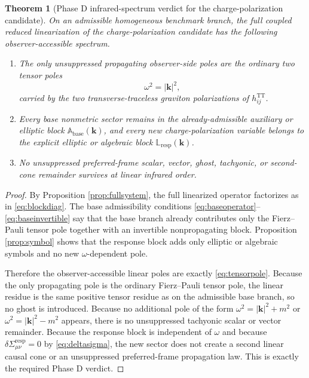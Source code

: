 \documentclass[11pt]{article}
\newcommand{\ResponseShift}{\Sigma^{\mathrm{resp}}}
\newcommand{\BaseEll}{\mathbb A_{\mathrm{base}}}
\newcommand{\RespLin}{\mathbb L_{\mathrm{resp}}}
\newcommand{\TT}{\mathrm{TT}}
\newtheorem{theorem}{Theorem}
\begin{document}
\begin{theorem}[Phase D infrared-spectrum verdict for the charge-polarization candidate]
\label{thm:phaseD}
On an admissible homogeneous benchmark branch, the full coupled reduced linearization of the charge-polarization candidate has the following observer-accessible spectrum.
\begin{enumerate}
    \item The only unsuppressed propagating observer-side poles are the ordinary two tensor poles
    \begin{equation}
    \omega^2=|\mathbf{k}|^2,
    \label{eq:tensorpole}
    \end{equation}
    carried by the two transverse-traceless graviton polarizations of \(h^{\TT}_{ij}\).
    \item Every base nonmetric sector remains in the already-admissible auxiliary or elliptic block \(\BaseEll(\mathbf{k})\), and every new charge-polarization variable belongs to the explicit elliptic or algebraic block \(\RespLin(\mathbf{k})\).
    \item No unsuppressed preferred-frame scalar, vector, ghost, tachyonic, or second-cone remainder survives at linear infrared order.
\end{enumerate}
\end{theorem}

\begin{proof}
By Proposition \ref{prop:fullsystem}, the full linearized operator factorizes as in \eqref{eq:blockdiag}. The base admissibility conditions \eqref{eq:baseoperator}--\eqref{eq:baseinvertible} say that the base branch already contributes only the Fierz--Pauli tensor pole together with an invertible nonpropagating block. Proposition \ref{prop:symbol} shows that the response block adds only elliptic or algebraic symbols and no new \(\omega\)-dependent pole.

Therefore the observer-accessible linear poles are exactly \eqref{eq:tensorpole}. Because the only propagating pole is the ordinary Fierz--Pauli tensor pole, the linear residue is the same positive tensor residue as on the admissible base branch, so no ghost is introduced. Because no additional pole of the form \(\omega^2=|\mathbf{k}|^2+m^2\) or \(\omega^2=|\mathbf{k}|^2-m^2\) appears, there is no unsuppressed tachyonic scalar or vector remainder. Because the response block is independent of \(\omega\) and because \(\delta\ResponseShift_{\mu\nu}=0\) by \eqref{eq:deltasigma}, the new sector does not create a second linear causal cone or an unsuppressed preferred-frame propagation law. This is exactly the required Phase D verdict.
\end{proof}
\end{document}
